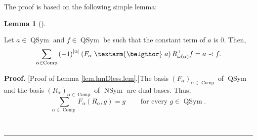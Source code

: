 \documentclass[numbers=enddot,12pt,final,onecolumn,notitlepage,abstracton]{scrartcl}%
\theoremstyle{definition}
\newtheorem{lem}[theo]{Lemma}
\newenvironment{lemma}[1][]
{\begin{lem}[#1]\begin{leftbar}}
{\end{leftbar}\end{lem}}
\newenvironment{proof}[1][Proof]{\noindent\textbf{#1.} }{\ \rule{0.5em}{0.5em}}
\newcommand{\bel}{\left. \textarm{\belgthor} \right.}
\let\sumnonlimits\sum
\renewcommand{\sum}{\sumnonlimits\limits}
\begin{document}
The proof is based on the following simple lemma:

\begin{lemma}
\label{lem.hmDless.lem}Let $a\in\operatorname*{QSym}$ and $f\in
\operatorname*{QSym}$ be such that the constant term of $a$ is $0$. Then,%
\[
\sum_{\alpha\in\operatorname*{Comp}}\left(  -1\right)  ^{\left\vert
\alpha\right\vert }\left(  F_{\alpha}\bel a\right)  R_{\omega\left(
\alpha\right)  }^{\perp}f=a\left.  \prec\right.  f.
\]

\end{lemma}

\begin{proof}
[Proof of Lemma \ref{lem.hmDless.lem}.]The basis $\left(  F_{\alpha}\right)
_{\alpha\in\operatorname*{Comp}}$ of $\operatorname*{QSym}$ and the basis
$\left(  R_{\alpha}\right)  _{\alpha\in\operatorname*{Comp}}$ of
$\operatorname*{NSym}$ are dual bases. Thus,%
\begin{equation}
\sum_{\alpha\in\operatorname*{Comp}}F_{\alpha}\left(  R_{\alpha},g\right)
=g\ \ \ \ \ \ \ \ \ \ \text{for every }g\in\operatorname*{QSym}.
\label{pf.lem.hmDless.lem.dualbases}%
\end{equation}



\end{proof}
\end{document}
